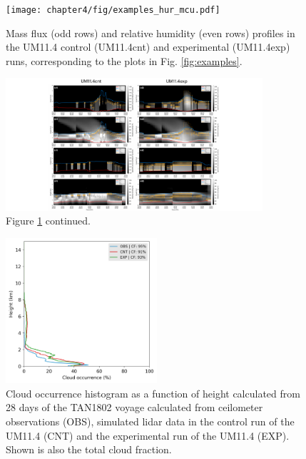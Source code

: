 \clearpage

\begin{figure}[t]
\centering
\texttt{[image: chapter4/fig/examples\_hur\_mcu.pdf]}
\caption{Mass flux (odd rows) and relative humidity (even rows) profiles in the UM11.4 control (UM11.4cnt)
and experimental (UM11.4exp) runs, corresponding to the plots in Fig. \ref{fig:examples}.
}
\label{fig:examples-hur-mcu}
\end{figure}

\clearpage

\begin{figure}[t]
\centering
\includegraphics[width=0.85\textwidth]{chapter4/fig/examples_hur_mcu_cont.pdf}
\caption{Figure \ref{fig:examples-hur-mcu} continued.
}
\label{fig:examples-hur-mcu-cont}
\end{figure}

\clearpage

\begin{figure}[t]
\centering
\includegraphics[width=0.5\textwidth]{chapter4/fig/cloud_occurrence.png}
\caption{
Cloud occurrence histogram as a function of height calculated from
28 days of the TAN1802 voyage calculated from ceilometer observations (OBS),
simulated lidar data in the control run of the UM11.4 (CNT) and
the experimental run of the UM11.4 (EXP).
Shown is also the total cloud fraction.
}
\label{fig:cloud-occurrence}
\end{figure}

